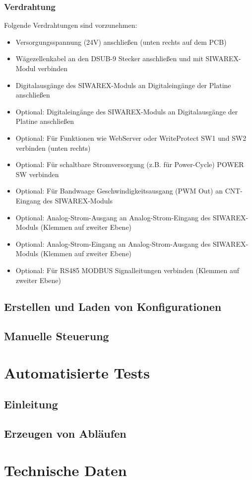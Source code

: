 \documentclass[12pt, a4paper]{report}
\begin{document}
\subsection{Verdrahtung}
Folgende Verdrahtungen sind vorzunehmen:
\begin{itemize}
\item Versorgungsspannung (24V) anschließen (unten rechts auf dem PCB)
\item Wägezellenkabel an den DSUB-9 Stecker anschließen und mit SIWAREX-Modul verbinden
\item Digitalausgänge des SIWAREX-Moduls an Digitaleingänge der Platine anschließen 
\item Optional: Digitaleingänge des SIWAREX-Moduls an Digitalausgänge der Platine anschließen 
\item Optional: Für Funktionen wie WebServer oder WriteProtect SW1 und SW2 verbinden (unten rechts)
\item Optional: Für schaltbare Stromversorgung (z.B. für Power-Cycle) POWER SW verbinden
\item Optional: Für Bandwaage Geschwindigkeitsausgang (PWM Out) an CNT-Eingang des SIWAREX-Moduls
\item Optional: Analog-Strom-Ausgang an Analog-Strom-Eingang des SIWAREX-Moduls (Klemmen auf zweiter Ebene) 
\item Optional: Analog-Strom-Eingang an Analog-Strom-Ausgang des SIWAREX-Moduls (Klemmen auf zweiter Ebene)
\item Optional: Für RS485 MODBUS Signalleitungen verbinden (Klemmen auf zweiter Ebene) 
\end{itemize}
\section{Erstellen und Laden von Konfigurationen}
\section{Manuelle Steuerung}
\chapter{Automatisierte Tests}
\section{Einleitung}
\section{Erzeugen von Abläufen}
\chapter{Technische Daten}
\end{document}
